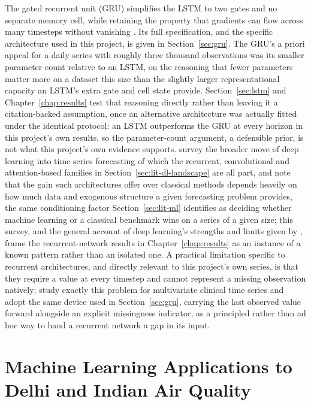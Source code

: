 \documentclass[12pt,a4paper]{report}
\begin{document}
The gated recurrent unit (GRU) simplifies the LSTM to two gates and no
separate memory cell, while retaining the property that gradients can flow
across many timesteps without vanishing \citep{cho2014gru}. Its full
specification, and the specific architecture used in this project, is given
in Section~\ref{sec:gru}. The GRU's a priori appeal for a daily series with
roughly three thousand observations was its smaller parameter count
relative to an LSTM, on the reasoning that fewer parameters matter more on
a dataset this size than the slightly larger representational capacity an
LSTM's extra gate and cell state provide. Section~\ref{sec:lstm} and
Chapter~\ref{chap:results} test that reasoning directly rather than leaving
it a citation-backed assumption, once an alternative architecture was
actually fitted under the identical protocol: an LSTM outperforms the GRU
at every horizon in this project's own results, so the parameter-count
argument, a defensible prior, is not what this project's own evidence
supports. \citet{lim2021survey} survey the broader move of deep learning
into time series forecasting of which the recurrent, convolutional and
attention-based families in Section~\ref{sec:lit-dl-landscape} are all
part, and note that the gain such architectures offer over classical
methods depends heavily on how much data and exogenous structure a given
forecasting problem provides, the same conditioning factor
Section~\ref{sec:lit-ml} identifies as deciding whether machine learning or
a classical benchmark wins on a series of a given size; this survey, and
the general account of deep learning's strengths and limits given by
\citet{lecun2015deep}, frame the recurrent-network results in
Chapter~\ref{chap:results} as an instance of a known pattern rather than an
isolated one. A practical limitation specific to
recurrent architectures, and directly relevant to this project's own series,
is that they require a value at every timestep and cannot represent a
missing observation natively; \citet{che2018rnn} study exactly this problem
for multivariate clinical time series and adopt the same device used in
Section~\ref{sec:gru}, carrying the last observed value forward alongside an
explicit missingness indicator, as a principled rather than ad hoc way to
hand a recurrent network a gap in its input.

\section{Machine Learning Applications to Delhi and Indian Air Quality}
\end{document}

